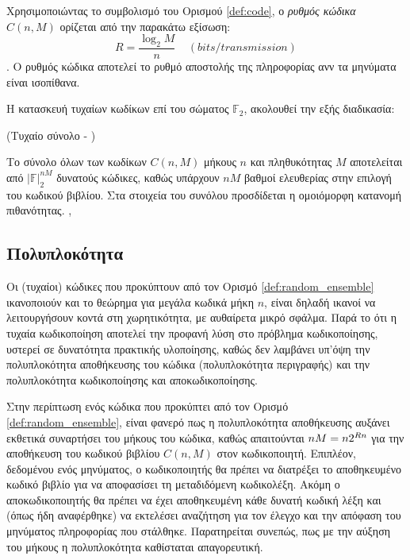 Χρησιμοποιώντας το συμβολισμό του Ορισμού \ref{def:code}, ο \textit{ρυθμός κώδικα} $C(n,M)$ ορίζεται από την παρακάτω εξίσωση:
\begin{equation}
R=\frac{\log_{2}M}{n}\;\;\;\;(bits/transmission)
\label{eq: code rate}
\end{equation}
\cite{cover2012elements}.
Ο ρυθμός κώδικα αποτελεί το ρυθμό αποστολής της πληροφορίας ανν τα μηνύματα είναι ισοπίθανα.

\vspace{5mm}
Η κατασκευή τυχαίων κωδίκων επί του σώματος $\mathbb{F}_2$, ακολουθεί την εξής διαδικασία:
\begin{definition}{(Τυχαίο σύνολο  - )}

Το σύνολο όλων των κωδίκων $C(n,M)$ μήκους $n$ και πληθυκότητας $M$ αποτελείται από $|\mathbb{F}|_2^{nM}$ δυνατούς κώδικες, καθώς υπάρχουν $nM$ βαθμοί ελευθερίας στην επιλογή του κωδικού βιβλίου. Στα στοιχεία του συνόλου προσδίδεται η ομοιόμορφη κατανομή πιθανότητας. \cite{richardson2008modern},\cite{shannon1948mathematical}
\label{def:random_ensemble}
\end{definition}

\subsection{Πολυπλοκότητα}
Oι (τυχαίοι) κώδικες που προκύπτουν από τον Ορισμό \ref{def:random_ensemble} ικανοποιούν και το θεώρημα  για μεγάλα κωδικά μήκη $n$, είναι δηλαδή ικανοί να λειτουργήσουν κοντά στη χωρητικότητα, με αυθαίρετα μικρό σφάλμα. Παρά το ότι η τυχαία κωδικοποίηση αποτελεί την προφανή λύση στο πρόβλημα κωδικοποίησης, υστερεί σε δυνατότητα πρακτικής υλοποίησης, καθώς δεν λαμβάνει υπ'όψη την πολυπλοκότητα αποθήκευσης του κώδικα (πολυπλοκότητα περιγραφής) και την πολυπλοκότητα κωδικοποίησης και αποκωδικοποίησης.

Στην περίπτωση ενός κώδικα που προκύπτει από τον Ορισμό \ref{def:random_ensemble}, είναι φανερό πως η πολυπλοκότητα αποθήκευσης αυξάνει εκθετικά συναρτήσει του μήκους του κώδικα, καθώς απαιτούνται $nM = n\*2^{Rn}$  για την αποθήκευση του κωδικού βιβλίου $C(n,M)$ στον κωδικοποιητή. Επιπλέον, δεδομένου ενός μηνύματος, ο κωδικοποιητής θα πρέπει να διατρέξει το αποθηκευμένο κωδικό βιβλίο για να αποφασίσει τη μεταδιδόμενη κωδικολέξη. Ακόμη ο αποκωδικοποιητής θα πρέπει να έχει αποθηκευμένη κάθε δυνατή κωδική λέξη και (όπως ήδη αναφέρθηκε) να εκτελέσει αναζήτηση για τον έλεγχο και την απόφαση του μηνύματος πληροφορίας που στάλθηκε. Παρατηρείται συνεπώς, πως με την αύξηση του μήκους  η πολυπλοκότητα καθίσταται απαγορευτική.

